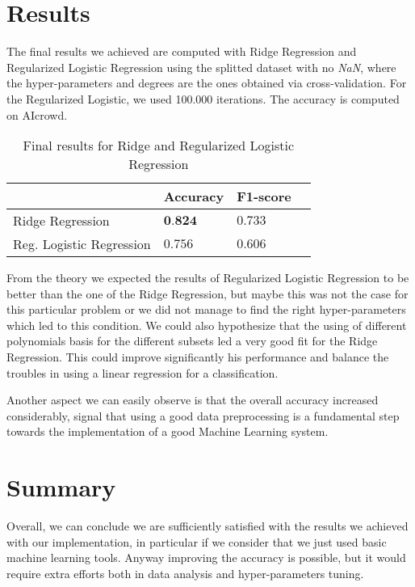 \documentclass[10pt,article]{IEEEtran}
\begin{document}
\section{Results}
\label{sec:results}
The final results we achieved are computed with Ridge Regression and Regularized Logistic Regression using the splitted dataset with no \textit{NaN}, where the hyper-parameters and degrees are the ones obtained via cross-validation. For the Regularized Logistic, we used 100.000 iterations. The accuracy is computed on AIcrowd.

\begin{table}[!h]
\centering
\label{tab:finalresults}
\begin{tabular}{l|l|l|l}
\cline{2-3}
                                                 & Accuracy & F1-score          \\ 
\hline
\multicolumn{1}{|l|}{Ridge Regression}                     & $\textbf{0.824}$     & $0.733$             \\ 
\cline{1-1}
\multicolumn{1}{|l|}{Reg. Logistic Regression}  & $0.756$          & $0.606$                 \\
\hline
\end{tabular}
\caption{Final results for Ridge and Regularized Logistic Regression }
\vspace{-0.5cm}
\end{table}

From the theory we expected the results of Regularized Logistic Regression to be better than the one of the Ridge Regression, but maybe this was not the case for this particular problem or we did not manage to find the right hyper-parameters which led to this condition. We could also hypothesize that the using of different polynomials basis for the different subsets led a very good fit for the Ridge Regression. This could improve significantly his performance and balance the troubles in using a linear regression for a classification.

Another aspect we can easily observe is that the overall accuracy increased considerably, signal that using a good data preprocessing is a fundamental step towards the implementation of a good Machine Learning system.


\section{Summary}

Overall, we can conclude we are sufficiently satisfied with the results we achieved with our implementation, in particular if we consider that we just used basic machine learning tools. Anyway improving the accuracy is possible, but it would require extra efforts both in data analysis and hyper-parameters tuning. 
\end{document}

